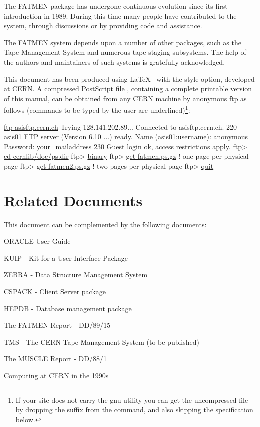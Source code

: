 The FATMEN package has undergone continuous evolution since its
first introduction in 1989. During this time many people   
have contributed to the system,
through discussions or by providing code and assistance.

The FATMEN system depends upon a number of other packages, such
as the Tape Management System and numerous tape staging subsystems.
The help of the authors and maintainers of such systems is 
gratefully acknowledged.

This document has been produced using \LaTeX~\cite{bib-LATEX}
with the  style option, developed at CERN. 
A compressed PostScript file , 
containing a complete printable version
of this manual, can be obtained from any CERN machine
by anonymous ftp as follows
(commands to be typed by the user are underlined)\footnote{%
If your site does not carry the gnu  utility you can get the
uncompressed file by dropping the  suffix from the
 command, and also skipping the 
specification below.}:

\begin{XMP}
    \underline{ftp asisftp.cern.ch}
    Trying 128.141.202.89...
    Connected to asisftp.cern.ch.
    220 asis01 FTP server (Version 6.10 ...) ready.
    Name (asis01:username): \underline{anonymous}
    Password: \underline{your\_{}mailaddress}
    230 Guest login ok, access restrictions apply.
    ftp> \underline{cd cernlib/doc/ps.dir}
    ftp> \underline{binary}
    ftp> \underline{get fatmen.ps.gz}    ! one page per physical page
    ftp> \underline{get fatmen2.ps.gz}   ! two pages per physical page
    ftp> \underline{quit}
\end{XMP}


\section*{Related Documents}
\par This document can be complemented by the following documents:
\begin{UL}
\item ORACLE User Guide~\cite{bib-ORACLE}
\item KUIP - Kit for a User Interface Package~\cite{bib-KUIP}
\item ZEBRA - Data Structure Management System~\cite{bib-ZEBRA}
\item CSPACK - Client Server package~\cite{bib-CSPACK}
\item HEPDB - Database management package~\cite{bib-HEPDB}
\item The FATMEN Report - DD/89/15~\cite{bib-FATREP}
\item TMS - The CERN Tape Management System (to be published)
\item The MUSCLE Report - DD/88/1~\cite{bib-MUSCLE}
\item Computing at CERN in the 1990s~\cite{bib-NGB}
\end{UL}

\newpage
\tableofcontents
\newpage
\listoffigures
\listoftables
